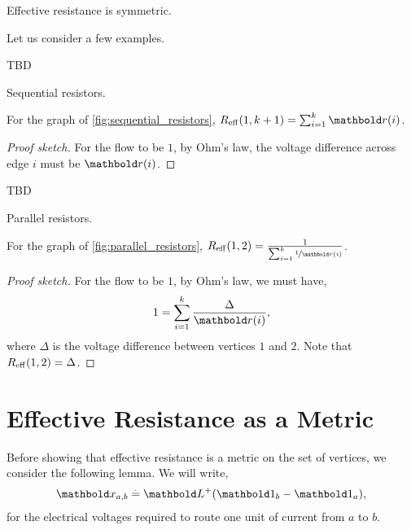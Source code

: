 \begin{cor}\label{cor:effective_resistance_symmetric}
Effective resistance is symmetric.
\end{cor}

Let us consider a few examples.

\begin{marginfigure}
TBD
\caption{Sequential resistors.}\label{fig:sequential_resistors}
\end{marginfigure}
\begin{lem}
For the graph of \cref{fig:sequential_resistors}, $\Reff(1,k+1) = \sum_{i=1}^k \vr(i)$.
\end{lem}
\begin{proof}[Proof sketch] For the flow to be $1$, by Ohm's law, the voltage difference across edge $i$ must be $\vr(i)$.
\end{proof}

\begin{marginfigure}
TBD
\caption{Parallel resistors.}\label{fig:parallel_resistors}
\end{marginfigure}
\begin{lem}
For the graph of \cref{fig:parallel_resistors}, $\Reff(1,2) = \frac{1}{\sum_{i=1}^k \nicefrac{1}{\vr(i)}}$.
\end{lem}
\begin{proof}[Proof sketch] For the flow to be $1$, by Ohm's law, we must have, \begin{align*}
    1 = \sum_{i=1}^k \frac{\Delta}{\vr(i)},
\end{align*} where $\Delta$ is the voltage difference between vertices $1$ and $2$. Note that $R_\mathrm{eff}(1,2) = \Delta$.
\end{proof}

\section{Effective Resistance as a Metric}

Before showing that effective resistance is a metric on the set of vertices, we consider the following lemma. We will write, \begin{align}
    \vx_{a,b} \defeq \pinv{\mL}(\vOne_b - \vOne_a),
\end{align} for the electrical voltages required to route one unit of current from $a$ to $b$.

